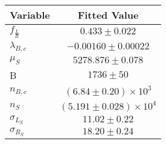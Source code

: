 \begin{tabular}[t]{lc}
\hline
Variable &Fitted Value\\
\hline\hline
$f_{\frac{L}{R}}$&$0.433\pm0.022$\\
\hline
$\lambda_{B,c}$&$-0.00160\pm0.00022$\\
\hline
$\mu_S$&$5278.876\pm0.078$\\
\hline
B&$1736\pm50$\\
\hline
$n_{B,c}$&$(6.84\pm0.20)\times 10^3$\\
\hline
$n_S$&$(5.191\pm0.028)\times 10^4$\\
\hline
$\sigma_{L_S}$&$11.02\pm0.22$\\
\hline
$\sigma_{R_S}$&$18.20\pm0.24$\\
\hline
\end{tabular}